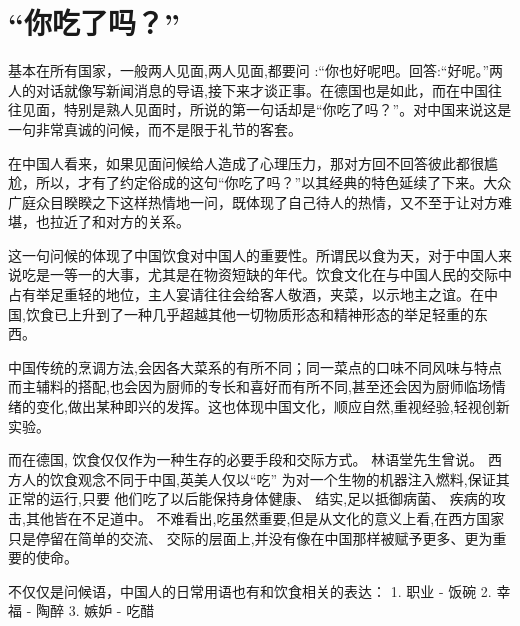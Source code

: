 \section{“你吃了吗？”}
基本在所有国家，一般两人见面,两人见面,都要问 :“你也好呢吧。回答:“好呢。”两人的对话就像写新闻消息的导语,接下来才谈正事。在德国也是如此，而在中国往往见面，特别是熟人见面时，所说的第一句话却是“你吃了吗？”。对中国来说这是一句非常真诚的问候，而不是限于礼节的客套。

在中国人看来，如果见面问候给人造成了心理压力，那对方回不回答彼此都很尴尬，所以，才有了约定俗成的这句“你吃了吗？”以其经典的特色延续了下来。大众广庭众目睽睽之下这样热情地一问，既体现了自己待人的热情，又不至于让对方难堪，也拉近了和对方的关系。

这一句问候的体现了中国饮食对中国人的重要性。所谓民以食为天，对于中国人来说吃是一等一的大事，尤其是在物资短缺的年代。饮食文化在与中国人民的交际中占有举足重轻的地位，主人宴请往往会给客人敬酒，夹菜，以示地主之谊。在中国,饮食已上升到了一种几乎超越其他一切物质形态和精神形态的举足轻重的东西。

中国传统的烹调方法,会因各大菜系的有所不同；同一菜点的口味不同风味与特点而主辅料的搭配,也会因为厨师的专长和喜好而有所不同,甚至还会因为厨师临场情绪的变化,做出某种即兴的发挥。这也体现中国文化，顺应自然,重视经验,轻视创新实验。

而在德国, 饮食仅仅作为一种生存的必要手段和交际方式。 林语堂先生曾说。 西方人的饮食观念不同于中国,英美人仅以“吃” 为对一个生物的机器注入燃料,保证其正常的运行,只要 他们吃了以后能保持身体健康、 结实,足以抵御病菌、 疾病的攻击,其他皆在不足道中。 不难看出,吃虽然重要,但是从文化的意义上看,在西方国家只是停留在简单的交流、 交际的层面上,并没有像在中国那样被赋予更多、更为重要的使命。

不仅仅是问候语，中国人的日常用语也有和饮食相关的表达：
1. 职业 - 饭碗
2. 幸福 - 陶醉
3. 嫉妒 - 吃醋
